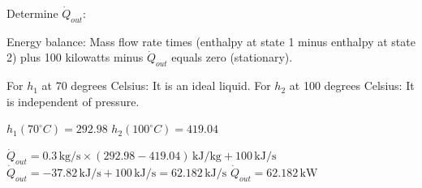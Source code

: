 Determine \( \dot{Q}_{out} \):  

Energy balance:  
Mass flow rate times (enthalpy at state 1 minus enthalpy at state 2) plus 100 kilowatts minus \( \dot{Q}_{out} \) equals zero (stationary).  

For \( h_1 \) at 70 degrees Celsius: It is an ideal liquid.  
For \( h_2 \) at 100 degrees Celsius: It is independent of pressure.  

\( h_1(70^\circ C) = 292.98 \)  
\( h_2(100^\circ C) = 419.04 \)  

\( \dot{Q}_{out} = 0.3 \, \text{kg/s} \times (292.98 - 419.04) \, \text{kJ/kg} + 100 \, \text{kJ/s} \)  
\( \dot{Q}_{out} = -37.82 \, \text{kJ/s} + 100 \, \text{kJ/s} = 62.182 \, \text{kJ/s} \)  
\( \dot{Q}_{out} = 62.182 \, \text{kW} \)